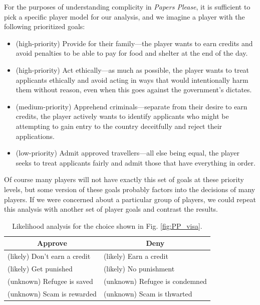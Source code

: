 \documentclass[arts,article,submit,moreauthors,pdftex,10pt,a4paper]{Definitions/mdpi}
\begin{document}
For the purposes of understanding complicity in \emph{Papers Please}, it is sufficient to pick a specific player model for our analysis, and we imagine a player with the following prioritized goals:
\begin{itemize}
  \item (high-priority) Provide for their family---the player wants to earn credits and avoid penalties to be able to pay for food and shelter at the end of the day.
  \item (high-priority) Act ethically---as much as possible, the player wants to treat applicants ethically and avoid acting in ways that would intentionally harm them without reason, even when this goes against the government's dictates.
  \item (medium-priority) Apprehend criminals---separate from their desire to earn credits, the player actively wants to identify applicants who might be attempting to gain entry to the country deceitfully and reject their applications.
  \item (low-priority) Admit approved travellers---all else being equal, the player seeks to treat applicants fairly and admit those that have everything in order.
\end{itemize}
Of course many players will not have exactly this set of goals at these priority levels, but some version of these goals probably factors into the decisions of many players.
%
If we were concerned about a particular group of players, we could repeat this analysis with another set of player goals and contrast the results.


\begin{table}[H]
\centering
\begin{tabular}{l l}
  \toprule
  \multicolumn{1}{c}{\textbf{Approve}} & \multicolumn{1}{c}{\textbf{Deny}} \\
  \midrule
  (likely) Don't earn a credit & (likely) Earn a credit \\
  (likely) Get punished & (likely) No punishment \\
  (unknown) Refugee is saved & (unknown) Refugee is condemned \\
  (unknown) Scam is rewarded & (unknown) Scam is thwarted \\
  \bottomrule
\end{tabular}
\caption[\emph{Papers Please} likelihood analysis]{Likelihood analysis for the choice shown in Fig. \ref{fig:PP_visa}.}
\label{tab:PP_likelihoods}
\end{table}
\end{document}
